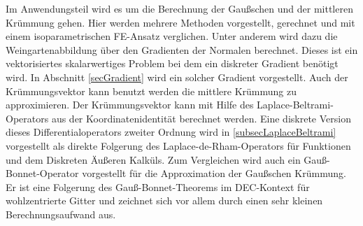 Im Anwendungsteil wird es um die Berechnung der Gaußschen und der mittleren Krümmung gehen.
Hier werden mehrere Methoden vorgestellt, gerechnet und mit einem isoparametrischen FE-Ansatz verglichen.
Unter anderem wird dazu die Weingartenabbildung über den Gradienten der Normalen berechnet.
Dieses ist ein vektorisiertes skalarwertiges Problem bei dem ein diskreter Gradient benötigt wird.
In Abschnitt \ref{secGradient} wird ein solcher Gradient vorgestellt.
Auch der Krümmungsvektor kann benutzt werden die mittlere Krümmung zu approximieren.
Der Krümmungsvektor kann mit Hilfe des Laplace-Beltrami-Operators aus der Koordinatenidentität berechnet werden.
Eine diskrete Version dieses Differentialoperators zweiter Ordnung wird in \ref{subsecLaplaceBeltrami} vorgestellt als direkte Folgerung
des Laplace-de-Rham-Operators für Funktionen und dem Diskreten Äußeren Kalküls.
Zum Vergleichen wird auch ein Gauß-Bonnet-Operator vorgestellt für die Approximation der Gaußschen Krümmung.
Er ist eine Folgerung des Gauß-Bonnet-Theorems im DEC-Kontext für wohlzentrierte Gitter und zeichnet sich vor allem durch einen sehr kleinen Berechnungsaufwand aus.
